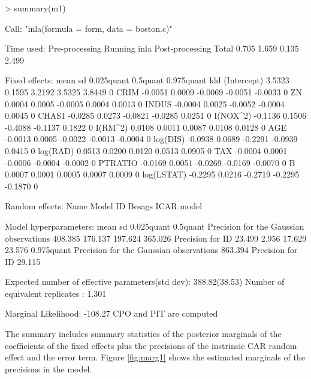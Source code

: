 \documentclass[article]{jss}
\begin{document}
\begin{Schunk}
\begin{Sinput}
> summary(m1)
\end{Sinput}
\begin{Soutput}
Call:
"inla(formula = form, data = boston.c)"

Time used:
 Pre-processing    Running inla Post-processing           Total 
          0.705           1.659           0.135           2.499 

Fixed effects:
               mean     sd 0.025quant 0.5quant 0.975quant kld
(Intercept)  3.5323 0.1595     3.2192   3.5325     3.8449   0
CRIM        -0.0051 0.0009    -0.0069  -0.0051    -0.0033   0
ZN           0.0004 0.0005    -0.0005   0.0004     0.0013   0
INDUS       -0.0004 0.0025    -0.0052  -0.0004     0.0045   0
CHAS1       -0.0285 0.0273    -0.0821  -0.0285     0.0251   0
I(NOX^2)    -0.1136 0.1506    -0.4088  -0.1137     0.1822   0
I(RM^2)      0.0108 0.0011     0.0087   0.0108     0.0128   0
AGE         -0.0013 0.0005    -0.0022  -0.0013    -0.0004   0
log(DIS)    -0.0938 0.0689    -0.2291  -0.0939     0.0415   0
log(RAD)     0.0513 0.0200     0.0120   0.0513     0.0905   0
TAX         -0.0004 0.0001    -0.0006  -0.0004    -0.0002   0
PTRATIO     -0.0169 0.0051    -0.0269  -0.0169    -0.0070   0
B            0.0007 0.0001     0.0005   0.0007     0.0009   0
log(LSTAT)  -0.2295 0.0216    -0.2719  -0.2295    -0.1870   0

Random effects:
Name	  Model
 ID   Besags ICAR model 

Model hyperparameters:
                                        mean    sd      0.025quant 0.5quant
Precision for the Gaussian observations 408.385 176.137 197.624    365.026 
Precision for ID                         23.499   2.956  17.629     23.576 
                                        0.975quant
Precision for the Gaussian observations 863.394   
Precision for ID                         29.115   

Expected number of effective parameters(std dev): 388.82(38.53)
Number of equivalent replicates : 1.301 

Marginal Likelihood:  -108.27 
CPO and PIT are computed
\end{Soutput}
\end{Schunk}
\noindent
The summary includes summary statistics of the posterior marginals of the
coefficients of the fixed effects plus the precisions of the instrinsic CAR
random effect and the error term. Figure \ref{fig:marg1} shows the estimated
marginals of the precisions in the model.
\end{document}
